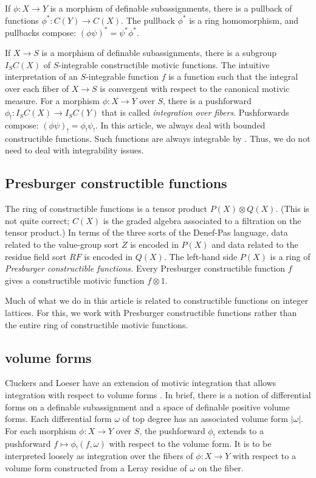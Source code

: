If $\phi:X\to Y$ is a morphism of definable subassignments, there is a pullback of functions $\phi^*:C(Y)\to C(X)$.  The
pullback $\phi^*$ is a ring homomorphism, and  pullbacks compose: $(\phi\psi)^* = \psi^* \phi^*$.

If $X\to S$ is a morphism of definable subassignments, there is  a subgroup $I_S C(X)$ of $S$-integrable constructible motivic functions.
The intuitive interpretation of an $S$-integrable function $f$ is a function such that the integral over each fiber of $X\to S$ 
is convergent with respect to the canonical motivic measure.  For a morphism $\phi: X\to Y$ over $S$, there is a 
pushforward $\phi_!:I_SC(X)\to I_SC(Y)$ that is called {\it integration over fibers}.  Pushforwards compose: $(\phi\psi)_! = \phi_!\psi_!$.
In this article, we always deal with bounded constructible functions.  Such functions are always integrable by 
\cite[Prop~12.2.2]{cluckers2008constructible}.
Thus, we do not need to deal with integrability issues.

\subsection{Presburger constructible functions}

The ring of constructible functions is a tensor product $P(X) \otimes Q(X)$.  (This is not quite correct; $C(X)$ is the graded
algebra associated to a filtration on the tensor product.)  In terms of the three sorts of the Denef-Pas language,
data related to the value-group sort $\ring{Z}$ is encoded in $P(X)$ and data related to the residue field sort $RF$ is encoded
in $Q(X)$.  The left-hand side $P(X)$ is a ring of {\it Presburger
constructible functions.}  Every Presburger constructible function $f$ gives a constructible motivic function $f\otimes 1$.

Much of what we do in this article is related to constructible functions on integer lattices.  For this, we work with Presburger
constructible functions rather than the entire ring of constructible motivic functions.

\subsection{volume forms}

Cluckers and Loeser have an extension of motivic integration that allows integration with respect to volume
forms \cite[\S8]{cluckers2008constructible}.  In brief, there is a notion of differential forms on a definable subassignment
and a space of definable positive volume forms.  Each differential form $\omega$ of top degree has an associated volume
form $|\omega|$.   For each morphism $\phi:X\to Y$ over $S$, the pushforward $\phi_!$ extends to a pushforward
$f \mapsto \phi_!(f,\omega)$ with respect to the volume form.   It is to be interpreted loosely as integration over
the fibers of $\phi:X\to Y$ with respect to a volume form constructed from a Leray residue of $\omega$ on the fiber.

